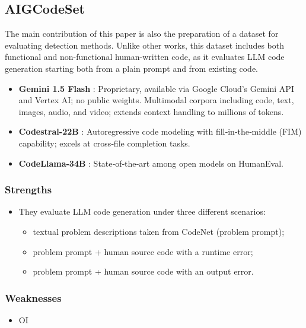 \subsection{AIGCodeSet}
The main contribution of this paper is also the preparation 
of a dataset for evaluating detection methods. Unlike other 
works, this dataset includes both functional and non-functional 
human-written code, as it evaluates LLM code generation starting 
both from a plain prompt and from existing code.


\begin{itemize}
    \item \textbf{Gemini 1.5 Flash} \cite{team2024gemini} : 
    Proprietary, available via Google Cloud’s Gemini API and Vertex AI; 
    no public weights. Multimodal corpora including code, text, images, 
    audio, and video; extends context handling to millions of tokens. 
    \item \textbf{Codestral-22B} \cite{mistral-codestral-2024} : 
    Autoregressive code modeling with fill‑in‑the‑middle (FIM) 
    capability; excels at cross‑file completion tasks.
    \item \textbf{CodeLlama-34B} \cite{roziere2023code} :
    State‑of‑the‑art among open models on HumanEval.
\end{itemize}





\subsubsection*{Strengths}
\begin{itemize}
    \item They evaluate LLM code generation under three different scenarios:
    \begin{itemize}
        \item textual problem descriptions taken from CodeNet (problem prompt);
        \item problem prompt + human source code with a runtime error;
        \item problem prompt + human source code with an output error.
    \end{itemize}
\end{itemize}


\subsubsection*{Weaknesses}
\begin{itemize}
    \item OI
\end{itemize}


